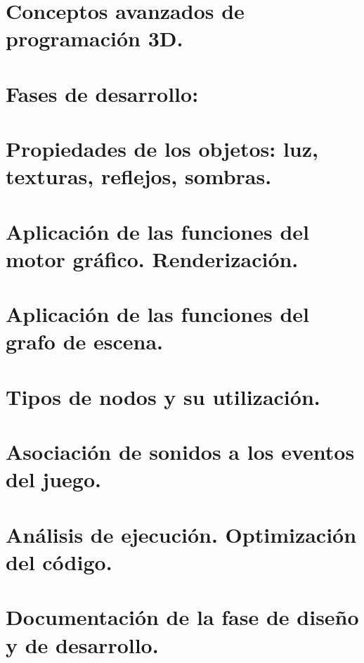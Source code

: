 \documentclass[a4paper,12pt,spanish]{sphinxmanual}
\begin{document}
\section{Conceptos avanzados de programación 3D.}
\label{index:conceptos-avanzados-de-programacion-3d}

\section{Fases de desarrollo:}
\label{index:fases-de-desarrollo}

\section{Propiedades de los objetos: luz, texturas, reflejos, sombras.}
\label{index:propiedades-de-los-objetos-luz-texturas-reflejos-sombras}

\section{Aplicación de las funciones del motor gráfico. Renderización.}
\label{index:aplicacion-de-las-funciones-del-motor-grafico-renderizacion}

\section{Aplicación de las funciones del grafo de escena.}
\label{index:aplicacion-de-las-funciones-del-grafo-de-escena}

\section{Tipos de nodos y su utilización.}
\label{index:tipos-de-nodos-y-su-utilizacion}

\section{Asociación de sonidos a los eventos del juego.}
\label{index:asociacion-de-sonidos-a-los-eventos-del-juego}

\section{Análisis de ejecución. Optimización del código.}
\label{index:analisis-de-ejecucion-optimizacion-del-codigo}

\section{Documentación de la fase de diseño y de desarrollo.}
\label{index:documentacion-de-la-fase-de-diseno-y-de-desarrollo}
\end{document}
